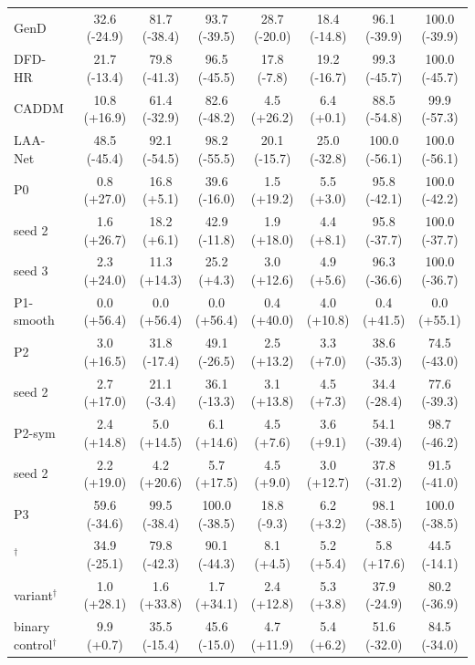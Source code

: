 \begin{tabular}{@{}l ccccccc@{}}
GenD~\cite{gend2026} & 32.6 (-24.9) & 81.7 (-38.4) & 93.7 (-39.5) & 28.7 (-20.0) & 18.4 (-14.8) & 96.1 (-39.9) & 100.0 (-39.9) \\
DFD-HR~\cite{dfdhr2026} & 21.7 (-13.4) & 79.8 (-41.3) & 96.5 (-45.5) & 17.8 (-7.8) & 19.2 (-16.7) & 99.3 (-45.7) & 100.0 (-45.7) \\
CADDM~\cite{caddm} & 10.8 (+16.9) & 61.4 (-32.9) & 82.6 (-48.2) & 4.5 (+26.2) & 6.4 (+0.1) & 88.5 (-54.8) & 99.9 (-57.3) \\
LAA-Net~\cite{laanet} & 48.5 (-45.4) & 92.1 (-54.5) & 98.2 (-55.5) & 20.1 (-15.7) & 25.0 (-32.8) & 100.0 (-56.1) & 100.0 (-56.1) \\
\midrule
P0 & 0.8 (+27.0) & 16.8 (+5.1) & 39.6 (-16.0) & 1.5 (+19.2) & 5.5 (+3.0) & 95.8 (-42.1) & 100.0 (-42.2) \\
\quad seed 2 & 1.6 (+26.7) & 18.2 (+6.1) & 42.9 (-11.8) & 1.9 (+18.0) & 4.4 (+8.1) & 95.8 (-37.7) & 100.0 (-37.7) \\
\quad seed 3 & 2.3 (+24.0) & 11.3 (+14.3) & 25.2 (+4.3) & 3.0 (+12.6) & 4.9 (+5.6) & 96.3 (-36.6) & 100.0 (-36.7) \\
P1-smooth & 0.0 (+56.4) & 0.0 (+56.4) & 0.0 (+56.4) & 0.4 (+40.0) & 4.0 (+10.8) & 0.4 (+41.5) & 0.0 (+55.1) \\
P2 & 3.0 (+16.5) & 31.8 (-17.4) & 49.1 (-26.5) & 2.5 (+13.2) & 3.3 (+7.0) & 38.6 (-35.3) & 74.5 (-43.0) \\
\quad seed 2 & 2.7 (+17.0) & 21.1 (-3.4) & 36.1 (-13.3) & 3.1 (+13.8) & 4.5 (+7.3) & 34.4 (-28.4) & 77.6 (-39.3) \\
P2-sym & 2.4 (+14.8) & 5.0 (+14.5) & 6.1 (+14.6) & 4.5 (+7.6) & 3.6 (+9.1) & 54.1 (-39.4) & 98.7 (-46.2) \\
\quad seed 2 & 2.2 (+19.0) & 4.2 (+20.6) & 5.7 (+17.5) & 4.5 (+9.0) & 3.0 (+12.7) & 37.8 (-31.2) & 91.5 (-41.0) \\
P3 & 59.6 (-34.6) & 99.5 (-38.4) & 100.0 (-38.5) & 18.8 (-9.3) & 6.2 (+3.2) & 98.1 (-38.5) & 100.0 (-38.5) \\
\ours{}$^\dagger$ & 34.9 (-25.1) & 79.8 (-42.3) & 90.1 (-44.3) & 8.1 (+4.5) & 5.2 (+5.4) & 5.8 (+17.6) & 44.5 (-14.1) \\
\ours{} variant$^\dagger$ & 1.0 (+28.1) & 1.6 (+33.8) & 1.7 (+34.1) & 2.4 (+12.8) & 5.3 (+3.8) & 37.9 (-24.9) & 80.2 (-36.9) \\
binary control$^\dagger$ & 9.9 (+0.7) & 35.5 (-15.4) & 45.6 (-15.0) & 4.7 (+11.9) & 5.4 (+6.2) & 51.6 (-32.0) & 84.5 (-34.0) \\
\bottomrule
\end{tabular}
